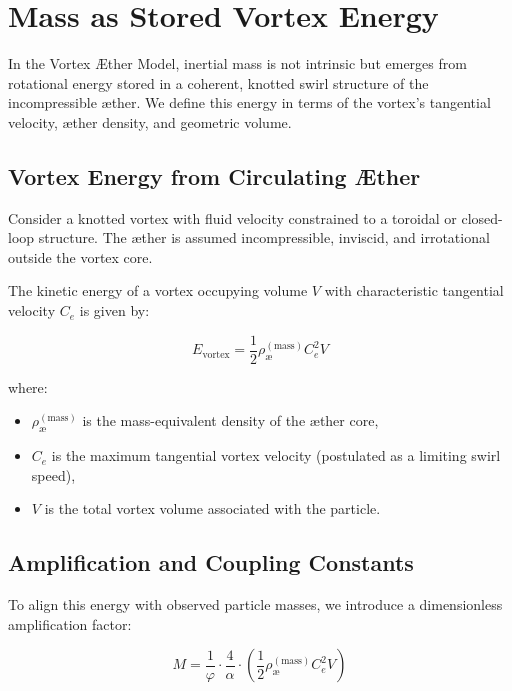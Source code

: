 \section{Mass as Stored Vortex Energy}

In the Vortex \AE ther Model, inertial mass is not intrinsic but emerges from rotational energy stored in a coherent, knotted swirl structure of the incompressible æther. We define this energy in terms of the vortex's tangential velocity, æther density, and geometric volume.

\subsection{Vortex Energy from Circulating Æther}

Consider a knotted vortex with fluid velocity constrained to a toroidal or closed-loop structure. The æther is assumed incompressible, inviscid, and irrotational outside the vortex core.

The kinetic energy of a vortex occupying volume \( V \) with characteristic tangential velocity \( C_e \) is given by:

\begin{equation}
E_{\text{vortex}} = \frac{1}{2} \rho_\text{\ae}^{(\text{mass})} C_e^2 V
\end{equation}

where:
\begin{itemize}
\item \( \rho_\text{\ae}^{(\text{mass})} \) is the mass-equivalent density of the æther core,
\item \( C_e \) is the maximum tangential vortex velocity (postulated as a limiting swirl speed),
\item \( V \) is the total vortex volume associated with the particle.
\end{itemize}

\subsection{Amplification and Coupling Constants}

To align this energy with observed particle masses, we introduce a dimensionless amplification factor:

\begin{equation}
M = \frac{1}{\varphi} \cdot \frac{4}{\alpha} \cdot \left( \frac{1}{2} \rho_\text{\ae}^{(\text{mass})} C_e^2 V \right)
\end{equation}

